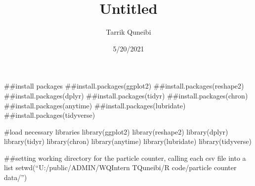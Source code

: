\documentclass[
]{article}
\title{Untitled}
\author{Tarrik Quneibi}
\date{5/20/2021}
\begin{document}
\maketitle

\#\#install packages \#\#install.packages(ggplot2)
\#\#install.packages(reshape2) \#\#install.packages(dplyr)
\#\#install.packages(tidyr) \#\#install.packages(chron)
\#\#install.packages(anytime) \#\#install.packages(lubridate)
\#\#install.packages(tidyverse)

\#load necessary libraries library(ggplot2) library(reshape2)
library(dplyr) library(tidyr) library(chron) library(anytime)
library(lubridate) library(tidyverse)

\#\#setting working directory for the particle counter, calling each csv
file into a list setwd(``U:/public/ADMIN/WQIntern TQuneibi/R
code/particle counter data/'')
\end{document}
